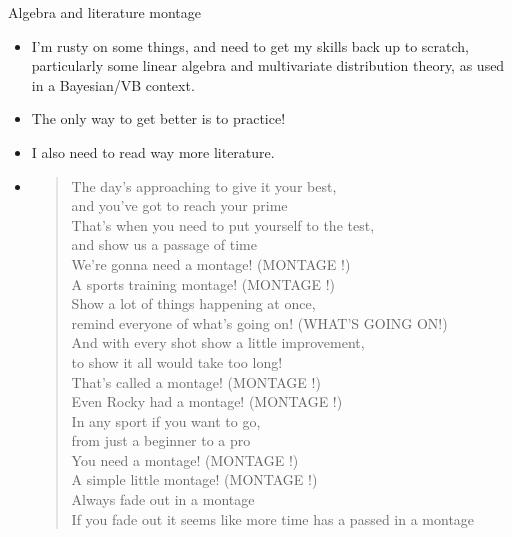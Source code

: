 \documentclass{beamer}
\begin{document}
\begin{frame}{Algebra and literature montage}

\begin{itemize}
\item I'm rusty on some things, and need to get my skills back up to scratch, particularly some linear 
algebra and multivariate distribution theory, as used in a Bayesian/VB context.
\item The only way to get better is to practice!
\item I also need to read way more literature.
\item \begin{quote}
\tiny
The day's approaching to give it your best, \\
and you've got to reach your prime \\
That's when you need to put yourself to the test, \\
and show us a passage of time \\
We're gonna need a montage! (MONTAGE !) \\
A sports training montage! (MONTAGE !) \\
Show a lot of things happening at once, \\
remind everyone of what's going on! (WHAT'S GOING ON!) \\
And with every shot show a little improvement, \\
to show it all would take too long! \\
That's called a montage! (MONTAGE !) \\
Even Rocky had a montage! (MONTAGE !) \\
In any sport if you want to go, \\
from just a beginner to a pro \\
You need a montage! (MONTAGE !) \\
A simple little montage! (MONTAGE !) \\
Always fade out in a montage \\
If you fade out it seems like more time has a passed in a montage
\end{quote}

\end{itemize}
\end{frame}
\end{document}
